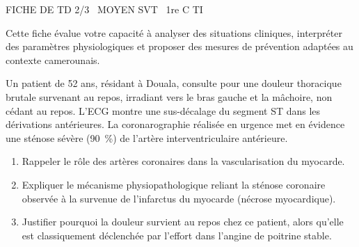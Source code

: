 \documentclass[11pt]{article}
\begin{document}
\begin{tcolorbox}[enhanced,colback=popink,colframe=popink,arc=10pt,boxrule=0pt,left=12pt,right=12pt,top=9pt,bottom=9pt]
{\color{white}\popxbold\small FICHE DE TD 2/3 \textbullet\ MOYEN \hfill SVT \textbullet\ 1re C TI\par}
\end{tcolorbox}
\vspace{4pt}
Cette fiche évalue votre capacité à analyser des situations cliniques, interpréter des paramètres physiologiques et proposer des mesures de prévention adaptées au contexte camerounais.

\begin{exercice}
\label{exo:coronaire}
Un patient de 52 ans, résidant à Douala, consulte pour une douleur thoracique brutale survenant au repos, irradiant vers le bras gauche et la mâchoire, non cédant au repos. L'ECG montre une sus-décalage du segment ST dans les dérivations antérieures. La coronarographie réalisée en urgence met en évidence une sténose sévère (\SI{90}{\%}) de l'artère interventriculaire antérieure.

\begin{enumerate}
    \item Rappeler le rôle des artères coronaires dans la vascularisation du myocarde.
    \item Expliquer le mécanisme physiopathologique reliant la sténose coronaire observée à la survenue de l'infarctus du myocarde (nécrose myocardique).
    \item Justifier pourquoi la douleur survient au repos chez ce patient, alors qu'elle est classiquement déclenchée par l'effort dans l'angine de poitrine stable.
\end{enumerate}
\end{exercice}
\end{document}
